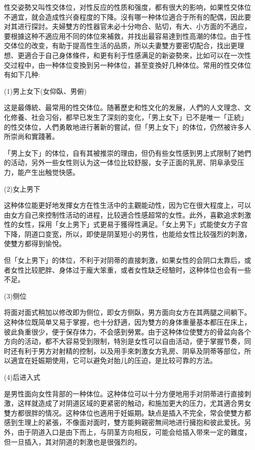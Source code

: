 \documentclass[12pt,UTF8]{ctexbook}
\begin{document}
性交姿勢又叫性交体位，对性反应的性质和强度，都有很大的影响，如果性交体位不適宜，就会造成性兴奋程度的下降。沒有哪一种体位適合于所有的配偶，因此要对其进行探討。夫婦雙方的性器官未必十分吻合、贴切，有大、小方面的不適应，要根據这种不適应用不同的体位來補救，并找出最容易達到性高潮的体位。由于性交体位的改变，有助于提高性生活的品质，所以夫妻雙方要密切配合，找出更理想、更適合于自己身体條件，和更有利于性感满足的新姿勢來，比如可以在一次性交过程中，由一种体位变換到另一种体位，甚至变換好几种体位。常用的性交体位有如下几种:

(1)男上女下(女仰臥、男俯)

这是最傳統、最常用的性交体位。随著歷史和性文化的发展，人們的人文理念、文化修養、社会习俗，都早已发生了深刻的变化，「男上女下」已不是唯一「正統」的性交体位，人們勇敢地进行著新的嘗試，但「男上女下」的体位，仍然被许多人所崇尚和實踐著。

「男上女下」的体位，自有其被推崇的理由，但仍有些女性感到男上式限制了她們的活动，另外一些女性则认为这一体位比较舒服，女子正面的乳房、阴阜承受压力，能产生出触觉快感。

(2)女上男下

这种体位能更好地发揮女方在性生活中的主觀能动性，因为它在很大程度上，可以由女方自己來控制性活动的进程，比较適合性感超常的女性。此外，喜歡追求刺激性的女性，採用「女上男下」式更易于獲得性满足。「女上男下」式能使女方子宫下降，阴道口变宽，所以，即使是阴茎短小的男性，也能给女性比较强烈的刺激，使雙方都得到愉悅。

但「女上男下」的体位，不利于对阴蒂的直接刺激，如果女性的会阴口太靠后，或者女性比较肥胖、身体过于龐大笨重，或者女性缺乏经驗时，这种体位也会有一些不足。

(3)侧位

将面对面式稍加以修改即为侧位，即女方侧臥，男方面向女方在其两腿之间躺下。这种体位既简单又易于掌握，也十分舒適，因为雙方的身体重量基本都压在床上，彼此負重很少，便于保存体力，不会感到勞累。由于这种体位使雙方的骨盆向各个方向的活动，都不大容易受到限制，特別是女性可以自由活动，便于掌握节奏，同时还有利于男方对射精的控制，以及用手來刺激女方乳房、阴阜及阴蒂等部位，所以適宜在妊娠期使用，它可以避免对胎儿的压迫，是比较可靠的方法。

(4)后进入式

是男性面向女性背部的一种体位。这种体位可以十分方便地用手对阴蒂进行直接刺激，这样就造成了对阴道区域的更紧密的触动，和施加更大的压力，尤其適合男女雙方都很胖的情况。这种体位也適用于妊娠期。缺点是插入不完全，常会使雙方都感到生理上的紧張，不像面对面时，雙方能夠親密無间地进行擁抱和彼此爱抚。另外，由于阴道入口是由下而上，与阴茎方向相反，可能会给插入带來一定的難度，但一旦插入，其对阴道的刺激也是很强烈的。
\end{document}
